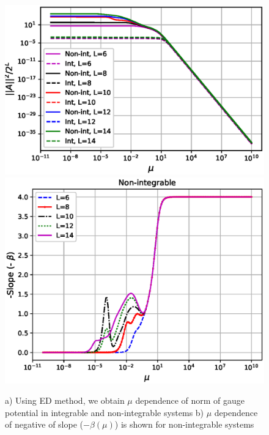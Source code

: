 \documentclass[11pt,a4paper]{article}
\begin{document}
\begin{figure}[!ht]
\begin{center}
\includegraphics[scale=0.51]{new_pics/v2_norm_mu_scaling.eps} 
\includegraphics[scale=0.43]{new_pics/v3_slope_nonint_semilogx.eps}
\caption{a) Using ED method, we obtain  $\mu$ dependence of norm of gauge potential in integrable and non-integrable systems b) $\mu$ dependence of negative of slope ($-\beta (\mu)$) is shown for non-integrable systems}
\label{mu_scaling}
\end{center}
\end{figure}
\end{document}
